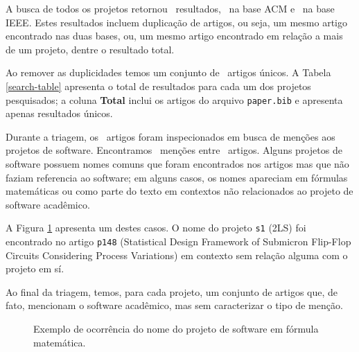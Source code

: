 
A busca de todos os projetos retornou \SearchCount \ resultados,
\SearchACMCount \ na base ACM e \SearchIEEECount \ na base IEEE.
Estes resultados incluem duplicação de artigos, ou seja,
um mesmo artigo encontrado nas duas bases, ou, um mesmo artigo
encontrado em relação a mais de um projeto, dentre o resultado total.

Ao remover as duplicidades temos um conjunto de \SearchUniqueCount \ artigos
únicos.  A Tabela \ref{search-table} apresenta o total de resultados para cada
um dos projetos pesquisados; a coluna {\bf Total} inclui os artigos do arquivo
\texttt{paper.bib} e apresenta apenas resultados únicos.




Durante a triagem, 
os \SearchUniqueCount \ artigos foram inspecionados em busca de menções aos
projetos de software. Encontramos \ScreeningCount \ menções entre
\ScreeningUniqueCount \ artigos.
Alguns projetos de software possuem nomes comuns que foram encontrados nos
artigos mas que não faziam referencia ao software; em alguns casos, os nomes
apareciam em fórmulas matemáticas ou como parte do texto em contextos não
relacionados ao projeto de software acadêmico.

A Figura \ref{screenshot-paper-p148-2ls} apresenta um destes casos. O nome do
projeto \texttt{s1} (2LS) foi encontrado no artigo \texttt{p148} (Statistical
Design Framework of Submicron Flip-Flop Circuits Considering Process
Variations) em contexto sem relação alguma com o projeto em sí.

Ao final da triagem, temos, para cada projeto, um conjunto de artigos que, de
fato, mencionam o software acadêmico, mas sem caracterizar o tipo de menção.

\begin{figure}[h]
  \center
  \caption{Exemplo de ocorrência do nome do projeto de software em fórmula matemática.}
  \label{screenshot-paper-p148-2ls}
\end{figure}


